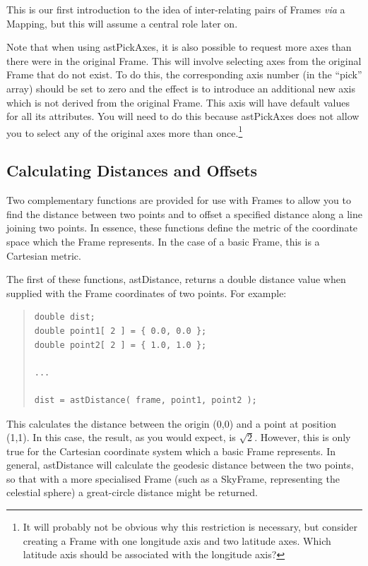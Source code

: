 \documentclass[twoside,11pt]{article}
\newcommand{\htmlref}[2]{#1}
\begin{document}
This is our first introduction to the idea of inter-relating pairs of
Frames {\em{via}} a Mapping, but this will assume a central role later on.

Note that when using astPickAxes, it is also possible to request more
axes than there were in the original Frame. This will involve
selecting axes from the original Frame that do not exist. To do this,
the corresponding axis number (in the ``pick'' array) should be set to
zero and the effect is to introduce an additional new axis which is
not derived from the original Frame. This axis will have default
values for all its attributes. You will need to do this because
astPickAxes does not allow you to select any of the original axes more
than once.\footnote{It will probably not be obvious why this
restriction is necessary, but consider creating a Frame with one
longitude axis and two latitude axes. Which latitude axis should be
associated with the longitude axis?}

\subsection{\label{ss:distanceandoffset}Calculating Distances and Offsets}

Two complementary functions are provided for use with Frames to allow
you to find the distance between two points and to offset a specified
distance along a line joining two points. In essence, these functions
define the metric of the coordinate space which the \htmlref{Frame}{Frame}
represents. In the case of a basic Frame, this is a Cartesian metric.

The first of these functions, \htmlref{astDistance}{astDistance}, returns a double distance
value when supplied with the Frame coordinates of two points. For
example:

\begin{quote}
\small
\begin{verbatim}
double dist;
double point1[ 2 ] = { 0.0, 0.0 };
double point2[ 2 ] = { 1.0, 1.0 };

...

dist = astDistance( frame, point1, point2 );
\end{verbatim}
\normalsize
\end{quote}

This calculates the distance between the origin (0,0) and a point at
position (1,1). In this case, the result, as you would expect, is
$\surd{2}$. However, this is only true for the Cartesian coordinate
system which a basic Frame represents. In general, astDistance will
calculate the geodesic distance between the two points, so that with a
more specialised Frame (such as a \htmlref{SkyFrame}{SkyFrame}, representing the celestial
sphere) a great-circle distance might be returned.
\end{document}
